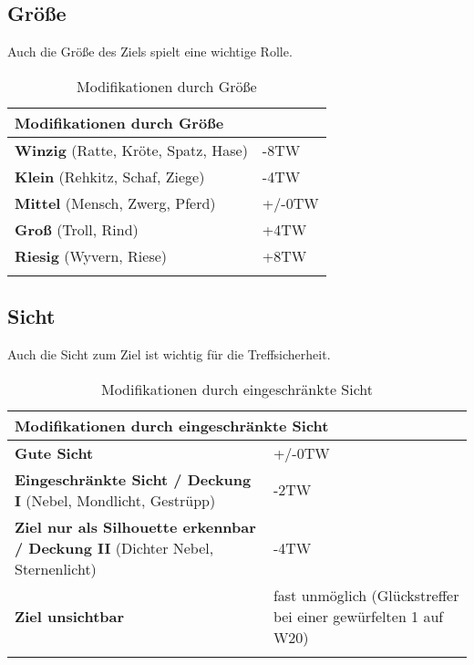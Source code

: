 \subsection{Größe}
Auch die Größe des Ziels spielt eine wichtige Rolle.

\begin{longtable}{|p{5cm}|p{6cm}|}
\hline
\multicolumn{2}{|l|}{\textbf{Modifikationen durch Grö{\ss}e}} \\ \hline
\textbf{Winzig} (Ratte, Kröte, Spatz, Hase) & -8TW \\ \hline
\textbf{Klein} (Rehkitz, Schaf, Ziege) & -4TW \\ \hline
\textbf{Mittel} (Mensch, Zwerg, Pferd) & +/-0TW \\ \hline
\textbf{Groß} (Troll, Rind) & +4TW \\ \hline
\textbf{Riesig} (Wyvern, Riese) & +8TW \\ \hline

\caption{Modifikationen durch Grö{\ss}e}
\label{tab:GrösseModifikationen}
\end{longtable}

\subsection{Sicht}
Auch die Sicht zum Ziel ist wichtig für die Treffsicherheit. 

\begin{longtable}{|p{5cm}|p{6cm}|}
\hline
\multicolumn{2}{|l|}{\textbf{Modifikationen durch eingeschränkte Sicht}} \\ \hline
\textbf{Gute Sicht} & +/-0TW \\ \hline
\textbf{Eingeschränkte Sicht / Deckung I} (Nebel, Mondlicht, Gestrüpp) & -2TW \\ \hline
\textbf{Ziel nur als Silhouette erkennbar / Deckung II} (Dichter Nebel, Sternenlicht) & -4TW \\ \hline
\textbf{Ziel unsichtbar} & fast unmöglich (Glückstreffer bei einer gewürfelten 1 auf W20) \\ \hline

\caption{Modifikationen durch eingeschränkte Sicht}
\label{tab:SichtModifikationen}
\end{longtable}


